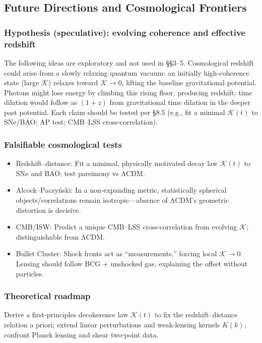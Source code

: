 \documentclass[11pt,a4paper]{article}
\begin{document}
\subsection{Future Directions and Cosmological Frontiers}


\subsubsection{Hypothesis (speculative): evolving coherence and effective redshift}


The following ideas are exploratory and not used in §§3–5. Cosmological redshift could arise from a slowly relaxing quantum vacuum: an initially high‑coherence state (large $\mathcal{K}$) relaxes toward $\mathcal{K}\to0$, lifting the baseline gravitational potential. Photons might lose energy by climbing this rising floor, producing redshift; time dilation would follow as $(1+z)$ from gravitational time dilation in the deeper past potential. Each claim should be tested per §8.5 (e.g., fit a minimal $\mathcal{K}(t)$ to SNe/BAO; AP test; CMB–LSS cross‑correlation).


\subsubsection{Falsifiable cosmological tests}


\begin{itemize}
\item Redshift–distance: Fit a minimal, physically motivated decay law $\mathcal{K}(t)$ to SNe and BAO; test parsimony vs ΛCDM.
\item Alcock–Paczyński: In a non‑expanding metric, statistically spherical objects/correlations remain isotropic—absence of ΛCDM’s geometric distortion is decisive.
\item CMB/ISW: Predict a unique CMB–LSS cross‑correlation from evolving $\mathcal{K}$; distinguishable from ΛCDM.
\item Bullet Cluster: Shock fronts act as “measurements,” forcing local $\mathcal{K}\to0$. Lensing should follow BCG + unshocked gas, explaining the offset without particles.
\end{itemize}


\subsubsection{Theoretical roadmap}


Derive a first‑principles decoherence law $\mathcal{K}(t)$ to fix the redshift–distance relation a priori; extend linear perturbations and weak‑lensing kernels $K(k)$; confront Planck lensing and shear two‑point data.
\end{document}
